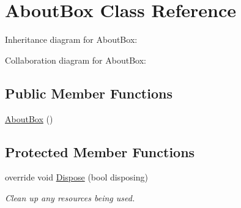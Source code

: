 \hypertarget{class_m_p_f_s21_1_1_about_box}{}\section{About\+Box Class Reference}
\label{class_m_p_f_s21_1_1_about_box}


Inheritance diagram for About\+Box\+:


Collaboration diagram for About\+Box\+:
\subsection*{Public Member Functions}
\begin{DoxyCompactItemize}
\item 
\hyperlink{class_m_p_f_s21_1_1_about_box_a3f44dc7ff8daea4c093b5ba3ad7097a5}{About\+Box} ()
\end{DoxyCompactItemize}
\subsection*{Protected Member Functions}
\begin{DoxyCompactItemize}
\item 
override void \hyperlink{class_m_p_f_s21_1_1_about_box_a849c3c7f8d08104f0cdb46bee9fe6389}{Dispose} (bool disposing)
\begin{DoxyCompactList}\small\item\em Clean up any resources being used. \end{DoxyCompactList}\end{DoxyCompactItemize}
